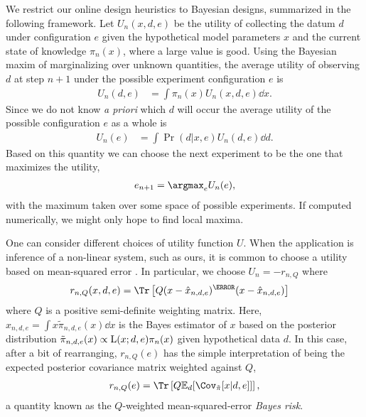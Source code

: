\documentclass[aps,nofootinbib,twocolumn,superscriptaddress]{revtex4}
\newcommand{\mps}{x}
\newcommand{\eps}{e}
\newcommand{\data}{d}
\begin{document}
We restrict our online design heuristics to Bayesian designs,
summarized in the following framework.
Let $U_n(\mps,\data,\eps)$ be the utility of collecting the datum
$\data$ under configuration $\eps$ given the hypothetical
model parameters $\mps$ and the current state of knowledge $\pi_n(\mps)$,
where a large value is good.
Using the Bayesian maxim of marginalizing over unknown quantities,
the average utility of observing $\data$ at step $n+1$ under
the possible experiment configuration $\eps$ is
\begin{align}
    U_n(\data,\eps)
        &= \int \pi_n(\mps)U_n(\mps,\data,\eps)\dd\mps.
\label{eq:future-utility}
\end{align}
Since we do not know \textit{a priori} which $\data$ will
occur the average utility of the possible configuration $\eps$ as a whole is
\begin{align}
    U_n(\eps)
        &= \int\Pr(\data|\mps,\eps)U_n(\data,\eps) \dd\data.
\label{eq:average-utility}
\end{align}
Based on this quantity we can choose the next experiment to be
the one that maximizes the utility,
\begin{align}
    \eps_{n+1} = \argmax_\eps U_n(\eps),
\end{align}
with the maximum taken over some space of possible experiments.
If computed numerically, we might only hope to find local maxima.

One can consider different choices of utility function $U$.
When the application is inference of a non-linear system, such as
ours, it is common to choose a utility based on
mean-squared error \cite{chaloner_bayesian_1995}.
In particular, we choose $U_n=-r_{n,Q}$ where
\begin{align}
    r_{n,Q}(\mps,\data,\eps)
        &= \Tr\left[Q(\mps - \hat\mps_{n,\data,\eps})^\T (\mps - \hat\mps_{n,\data,\eps})\right]
\end{align}
where $Q$ is a positive semi-definite weighting matrix.
Here, $\hat{\mps}_{n,\data,\eps}=\int \mps \tilde{\pi}_{n,\data,\eps}(\mps)\dd\mps$
is the Bayes estimator of $\mps$ based on the posterior distribution
$\tilde{\pi}_{n,\data,\eps}(\mps)\propto \Lhood(\mps;\data,\eps)\pi_n(\mps)$
given hypothetical data $\data$.
In this case, after a bit of rearranging,
$r_{n,Q}(\eps)$ has the simple interpretation
of being the expected posterior covariance matrix weighted
against $Q$,
\begin{align}
    r_{n,Q}(\eps) = \Tr \left[Q\expect_\data[\Cov_{\tilde{\pi}}
        [\mps|\data,\eps]]\right],
    \label{eq:bayes-risk}
\end{align}
a quantity known as the $Q$-weighted
mean-squared-error \textit{Bayes risk}.
\end{document}
